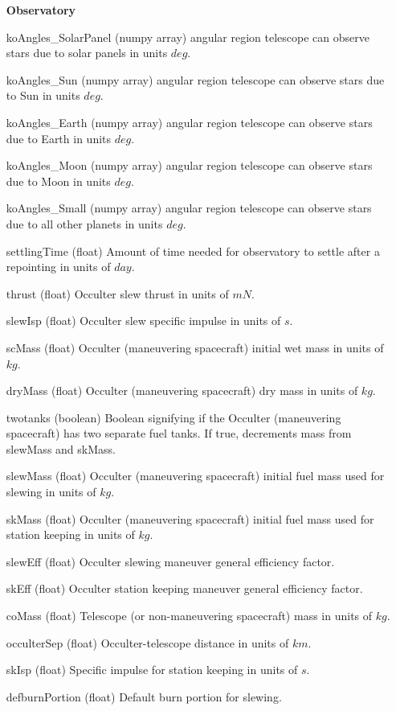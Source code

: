 \documentclass[cleanfoot]{asme2ej}
\begin{document}
\begin{itemize}[leftmargin=1.5in,font={\ttfamily}]
\item[\textbf{Observatory}]
\item[koAngles\_SolarPanel] (numpy array) angular region telescope can observe stars due to solar panels in units $deg$.
\item[koAngles\_Sun] (numpy array) angular region telescope can observe stars due to Sun in units $deg$.
\item[koAngles\_Earth] (numpy array) angular region telescope can observe stars due to Earth in units $deg$.
\item[koAngles\_Moon] (numpy array) angular region telescope can observe stars due to Moon in units $deg$.
\item[koAngles\_Small] (numpy array) angular region telescope can observe stars due to all other planets in units $deg$.
\item[settlingTime] (float) Amount of time needed for observatory to settle after a repointing in units of $ day $.
\item[thrust] (float) Occulter slew thrust in units of $ mN $.
\item[slewIsp] (float) Occulter slew specific impulse in units of $ s $.
\item[scMass] (float) Occulter (maneuvering spacecraft) initial wet mass in units of $ kg $. 
\item[dryMass] (float) Occulter (maneuvering spacecraft) dry mass in units of $ kg $.
\item[twotanks] (boolean) Boolean signifying if the Occulter (maneuvering spacecraft) has two separate fuel tanks. If true, decrements mass from slewMass and skMass.
\item[slewMass] (float) Occulter (maneuvering spacecraft) initial fuel mass used for slewing in units of $ kg $.
\item[skMass] (float) Occulter (maneuvering spacecraft) initial fuel mass used for station keeping in units of $ kg $.
\item[slewEff] (float) Occulter slewing maneuver general efficiency factor.
\item[skEff] (float) Occulter station keeping maneuver general efficiency factor.
\item[coMass] (float) Telescope (or non-maneuvering spacecraft) mass in units of $ kg $. 
\item[occulterSep] (float) Occulter-telescope distance in units of $ km $. 
\item[skIsp] (float) Specific impulse for station keeping in units of $ s $. 
\item[defburnPortion] (float) Default burn portion for slewing.

\end{itemize}
\end{document}
